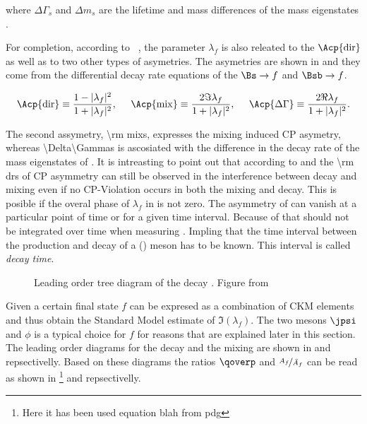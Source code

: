 \noindent where $\Delta\Gamma_s$ and $\Delta m_s$ are the lifetime and mass differences of the mass eigenstates .

For completion, according to ~\cite{DeBruyn-thesis,jeroenThesis}, the parameter $\lambda_f$ is also releated to the $\Acp{\rm dir}$ as well as to two
other types of asymetries. The asymetries are shown in  and they come from the differential decay rate equations of the $\Bs\to f$
 and $\Bsb\to f$.

\begin{equation}
  \Acp{\rm dir}      \equiv \frac{ 1-|\lambda_f|^2} {1 + |\lambda_f|^2},\;\;\;\;\;
  \Acp{\rm mix}      \equiv \frac{ 2 \Im\lambda_f} {1 + |\lambda_f|^2},\;\;\;\;\;
  \Acp{\Delta\Gamma} \equiv \frac{ 2 \Re\lambda_f} {1 + |\lambda_f|^2}.
\label{cp_asym_lambda}
\end{equation}

The second assymetry, \Acp{\rm mix}, expresses the mixing induced CP asymetry, whereas \Acp{\Delta\Gamma} is ascosiated with the
difference in the decay rate of the mass eigenstates of . It is intreasting to point out that according
to  and the \Acp{\rm dr} of  CP asymmetry can still be observed in the interference between decay and
mixing even if no CP-Violation occurs in both the mixing and decay. This is posible if the overal phase of $\lambda_f$ in  is not zero.
The asymmetry of  can vanish at a particular point of time or for a given time interval. Because of that  should not
be integrated over time when measuring \phis. Impling that the time interval between the production and decay of a \Bs (\Bsb) meson has to be
known. This interval is called {\it decay time}.

\begin{figure}[h]
  \centering
  {\sffamily }
  \caption{Leading order tree diagram of the decay \BsJpsiPhi. Figure from~\cite{jeroenThesis}}
  \label{bs2jpsiphi}
\end{figure}

Given a certain final state $f$  can be expresed as a combination of CKM elements and thus obtain the
Standard Model estimate of $\Im(\lambda_f)$. The two mesons $\jpsi$ and $\phi$ is a typical choice for $f$ for reasons that are
explained later in this section. The leading order diagrams for the \BsJpsiPhi decay and the \BBbarSyst mixing are
shown in  and  repsectivelly. Based on these diagrams the ratios $\qoverp$ and $\nicefrac{A_f}{\bar{A}_{f}}$
can be read as shown in \footnote{Here it has been used {\color{red} equation blah from pdg} } and  repsectivelly.

